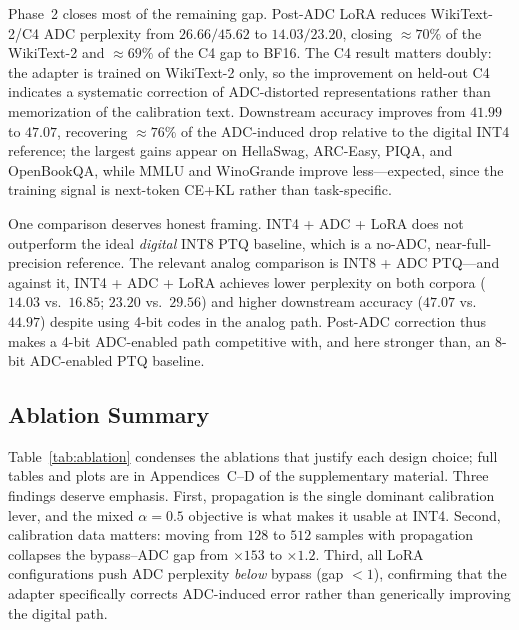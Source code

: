 \documentclass[letterpaper]{article} %
\theoremstyle{plain}
\begin{document}
Phase~2 closes most of the remaining gap. Post-ADC LoRA reduces WikiText-2/C4 ADC perplexity from $26.66/45.62$ to $14.03/23.20$, closing ${\approx}70\%$ of the WikiText-2 and ${\approx}69\%$ of the C4 gap to BF16. The C4 result matters doubly: the adapter is trained on WikiText-2 only, so the improvement on held-out C4 indicates a systematic correction of ADC-distorted representations rather than memorization of the calibration text. Downstream accuracy improves from $41.99$ to $47.07$, recovering ${\approx}76\%$ of the ADC-induced drop relative to the digital INT4 reference; the largest gains appear on HellaSwag, ARC-Easy, PIQA, and OpenBookQA, while MMLU and WinoGrande improve less---expected, since the training signal is next-token CE+KL rather than task-specific.

One comparison deserves honest framing. INT4 + ADC + LoRA does not outperform the ideal \emph{digital} INT8 PTQ baseline, which is a no-ADC, near-full-precision reference. The relevant analog comparison is INT8 + ADC PTQ---and against it, INT4 + ADC + LoRA achieves lower perplexity on both corpora ($14.03$ vs.\ $16.85$; $23.20$ vs.\ $29.56$) and higher downstream accuracy ($47.07$ vs.\ $44.97$) despite using 4-bit codes in the analog path. Post-ADC correction thus makes a 4-bit ADC-enabled path competitive with, and here stronger than, an 8-bit ADC-enabled PTQ baseline.

\subsection{Ablation Summary}

Table~\ref{tab:ablation} condenses the ablations that justify each design choice; full tables and plots are in Appendices~C--D of the supplementary material. Three findings deserve emphasis. First, propagation is the single dominant calibration lever, and the mixed $\alpha=0.5$ objective is what makes it usable at INT4. Second, calibration data matters: moving from $128$ to $512$ samples with propagation collapses the bypass--ADC gap from $\times153$ to $\times1.2$. Third, all LoRA configurations push ADC perplexity \emph{below} bypass (gap $<1$), confirming that the adapter specifically corrects ADC-induced error rather than generically improving the digital path.
\end{document}

